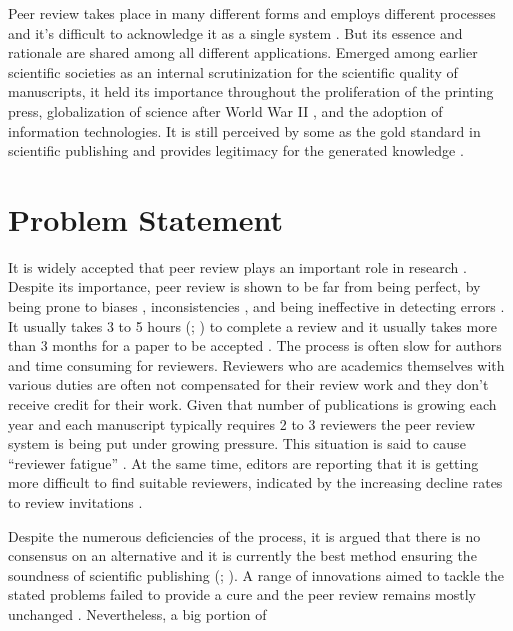 Peer review takes place in many different forms and employs different processes and it’s difficult to acknowledge it as a single system \parencite[2]{HorbachS.P.J.M..2017}. But its essence and rationale are shared among all different applications. Emerged among earlier scientific societies as an internal scrutinization for the scientific quality of manuscripts, it held its importance throughout the proliferation of the printing press, globalization of science after World War II \parencite{Fyfe.2017}, and the adoption of information technologies. It is still perceived by some as the gold standard in scientific publishing \parencite{Mayden.2012} and provides legitimacy for the generated knowledge \parencite{Tennant.2020c}.

\section{Problem Statement} \label{sec:problem-statement}

It is widely accepted that peer review plays an important role in research \parencite{Publons.2018, Taylor&Francis.2015, Ware.2008, Zuckerman.1971}. Despite its importance, peer review is shown to be far from being perfect, by being prone to biases \parencite{Lee.2013, Mahoney.1977}, inconsistencies \parencite{Peters.1982, Rothwell.2000}, and being ineffective in detecting errors \parencite{Schroter.2004}. It usually takes 3 to 5 hours (\cite[146]{Mulligan.2013}; \cite[42]{Ware.2008}) to complete a review and it usually takes more than 3 months for a paper to be accepted \parencite[51]{Ware.2008}. The process is often slow for authors and time consuming for reviewers. Reviewers who are academics themselves with various duties are often not compensated for their review work and they don’t receive credit for their work. Given that number of publications is growing each year \parencite{Bornmann.2015} and each manuscript typically requires 2 to 3 reviewers the peer review system is being put under growing pressure. This situation is said to cause “reviewer fatigue” \parencite{Breuning.2015}. At the same time, editors are reporting that it is getting more difficult to find suitable reviewers, indicated by the increasing decline rates to review invitations \parencite{Baveye.2011, Fox.2017}. 

Despite the numerous deficiencies of the process, it is argued that there is no consensus on an alternative \parencite{Smith.2006, Young.2003} and it is currently the best method ensuring the soundness of scientific publishing (\cite[5201]{Grainger.2007}; \cite[2]{HorbachS.P.J.M..2017}). A range of innovations aimed to tackle the stated problems failed to provide a cure and the peer review remains mostly unchanged \parencite{Tennant.2017}. Nevertheless, a big portion of 



